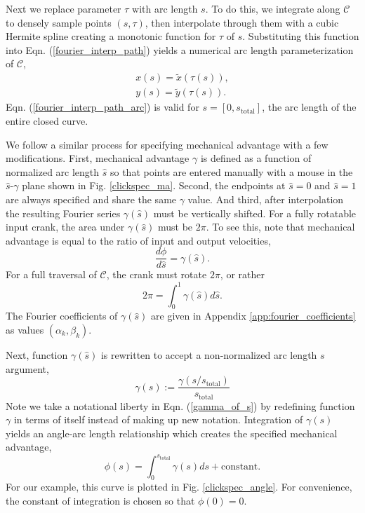 \documentclass[journal]{IEEEtran}
\begin{document}
Next we replace parameter $\tau$ with arc length $s$.
To do this, we integrate along $\mathcal{C}$ to densely sample points $(s, \tau)$, then interpolate through them with a cubic Hermite spline creating a monotonic function for $\tau$ of $s$.  Substituting this function into Eqn. (\ref{fourier_interp_path}) yields a numerical arc length parameterization of $\mathcal{C}$,
\begin{align}
x(s) = \tilde{x}(\tau(s)), \nonumber\\
y(s) = \tilde{y}(\tau(s)).
\label{fourier_interp_path_arc}
\end{align}
Eqn. (\ref{fourier_interp_path_arc}) is valid for $s=[0,s_\text{total}]$, the arc length of the entire closed curve.

We follow a similar process for specifying mechanical advantage with a few modifications.
First, mechanical advantage $\gamma$ is defined as a function of normalized arc length $\hat{s}$ so that points are entered manually with a mouse in the $\hat{s}$-$\gamma$ plane shown in Fig. \ref{clickspec_ma}.
Second, the endpoints at $\hat{s}\!=\!0$ and $\hat{s}\!=\!1$ are always specified and share the same $\gamma$ value.
And third, after interpolation the resulting Fourier series $\gamma(\hat{s})$ must be vertically shifted.
For a fully rotatable input crank, the area under $\gamma(\hat{s})$ must be $2\pi$.
To see this, note that mechanical advantage is equal to the ratio of input and output velocities,
\begin{equation}
\frac{d\phi}{d\hat{s}} = \gamma(\hat{s}).
\end{equation}
For a full traversal of $\mathcal{C}$, the crank must rotate $2\pi$, or rather
\begin{equation}
2\pi = \int_{0}^{1} \gamma(\hat{s}) d\hat{s}.
\end{equation}
The Fourier coefficients of $\gamma(\hat{s})$ are given in Appendix \ref{app:fourier_coefficients} as values $(\alpha_k, \beta_k)$.

Next, function $\gamma(\hat{s})$ is rewritten to accept a non-normalized arc length $s$ argument,
\begin{equation}
\gamma(s) := \frac{\gamma(s/s_\text{total})}{s_\text{total}}
\label{gamma_of_s}
\end{equation}
Note we take a notational liberty in Eqn. (\ref{gamma_of_s}) by redefining function $\gamma$ in terms of itself instead of making up new notation.
Integration of $\gamma(s)$ yields an angle-arc length relationship which creates the specified mechanical advantage,
\begin{equation}
\phi(s) = \int_{0}^{s_\text{total}} \gamma(s)ds + \text{constant}.
\end{equation}
For our example, this curve is plotted in Fig. \ref{clickspec_angle}.  For convenience, the constant of integration is chosen so that $\phi(0) = 0$.
\end{document}
